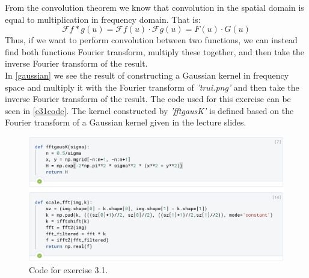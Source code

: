 From the convolution theorem we know that convolution in the spatial domain is equal to multiplication in frequency domain. That is:
\begin{equation*}
		\mathcal{F}{f*g}(u) = \mathcal{F}{f}(u)\cdot \mathcal{F}{g}(u) = F(u)\cdot G(u)
\end{equation*}
Thus, if we want to perform convolution between two functions, we can instead find both functions Fourier transform, multiply these together, and then take the inverse Fourier transform of the result.\\
In \autoref{gaussian} we see the result of constructing a Gaussian kernel in frequency space and multiply it with the Fourier transform of \textit{'trui.png'} and then take the inverse Fourier transform of the result. The code used for this exercise can be seen in \autoref{e31code}. The kernel constructed by \textit{'fftgausK'} is defined based on the Fourier transform of a Gaussian kernel given in the lecture slides.
\begin{figure}[H]
	\centering
	\includegraphics[width=\linewidth]{Materials/e31code}
	\caption{Code for exercise 3.1.}
	\label{e31code}
\end{figure}

